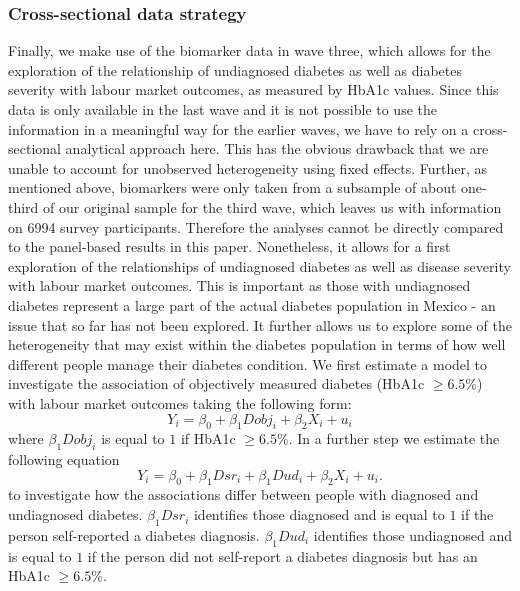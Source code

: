 \documentclass[12pt,english,british]{article}
\begin{document}
\subsubsection{Cross-sectional data strategy}

Finally, we make use of the biomarker data in wave three, which allows
for the exploration of the relationship of undiagnosed diabetes as
well as diabetes severity with labour market outcomes, as measured
by \ac{HbA1c} values. Since this data is only available in the
last wave and it is not possible to use the information in a meaningful
way for the earlier waves, we have to rely on a cross-sectional analytical
approach here. This has the obvious drawback that we are unable to
account for unobserved heterogeneity using fixed effects. Further,
as mentioned above, biomarkers were only taken from a subsample of
about one-third of our original sample for the third wave, which leaves
us with information on 6994 survey participants. Therefore the analyses
cannot be directly compared to the panel-based results in this paper.
Nonetheless, it allows for a first exploration of the relationships
of undiagnosed diabetes as well as disease severity with labour market
outcomes. This is important as those with undiagnosed diabetes represent
a large part of the actual diabetes population in Mexico - an issue
that so far has not been explored. It further allows us to explore
some of the heterogeneity that may exist within the diabetes population
in terms of how well different people manage their diabetes condition.
We first estimate a model to investigate the association of objectively
measured diabetes (HbA1c $\geq6.5\%$) with labour market outcomes
taking the following form: 
\begin{equation}
Y_{i}=\beta_{0}+\beta_{1}Dobj_{i}+\beta_{2}X_{i}+u_{i}\label{eq:diab_objective}
\end{equation}
where $\beta_{1}Dobj_{i}$ is equal to $1$ if HbA1c $\geq6.5\%$.
In a further step we estimate the following equation 
\begin{equation}
Y_{i}=\beta_{0}+\beta_{1}Dsr_{i}+\beta_{1}Dud_{i}+\beta_{2}X_{i}+u_{i}.\label{eq:diab_sr_ud}
\end{equation}
to investigate how the associations differ between people with diagnosed
and undiagnosed diabetes. $\beta_{1}Dsr_{i}$ identifies those diagnosed
and is equal to $1$ if the person self-reported a diabetes diagnosis.
$\beta_{1}Dud_{i}$ identifies those undiagnosed and is equal to $1$
if the person did not self-report a diabetes diagnosis but has an
HbA1c $\geq6.5\%$.
\end{document}
